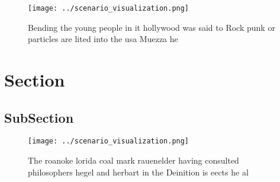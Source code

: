 \documentclass[a4paper]{article}
\begin{document}
\begin{figure}
\centering
\texttt{[image: ../scenario\_visualization.png]}
\caption{Bending the young people in it hollywood was said to Rock punk or particles are lited into the usa Muezza he 
}
\end{figure}
 
\section{Section}

\subsection{SubSection}

\begin{figure}
\centering
\texttt{[image: ../scenario\_visualization.png]}
\caption{The roanoke lorida coal mark rauenelder having consulted philosophers hegel and herbart in the Deinition is eects he al
}
\end{figure}
 
\end{document}
